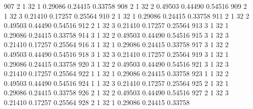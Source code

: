 \documentclass{article}
\begin{document}
\begin{Woutput}
 907      2       1      32       1       0.29086    0.24415    0.33758
 908      2       1      32       2       0.49503    0.44490    0.54516
 909      2       1      32       3       0.21410    0.17257    0.25564
 910      2       1      32       1       0.29086    0.24415    0.33758
 911      2       1      32       2       0.49503    0.44490    0.54516
 912      2       1      32       3       0.21410    0.17257    0.25564
 913      3       1      32       1       0.29086    0.24415    0.33758
 914      3       1      32       2       0.49503    0.44490    0.54516
 915      3       1      32       3       0.21410    0.17257    0.25564
 916      3       1      32       1       0.29086    0.24415    0.33758
 917      3       1      32       2       0.49503    0.44490    0.54516
 918      3       1      32       3       0.21410    0.17257    0.25564
 919      3       1      32       1       0.29086    0.24415    0.33758
 920      3       1      32       2       0.49503    0.44490    0.54516
 921      3       1      32       3       0.21410    0.17257    0.25564
 922      1       1      32       1       0.29086    0.24415    0.33758
 923      1       1      32       2       0.49503    0.44490    0.54516
 924      1       1      32       3       0.21410    0.17257    0.25564
 925      2       1      32       1       0.29086    0.24415    0.33758
 926      2       1      32       2       0.49503    0.44490    0.54516
 927      2       1      32       3       0.21410    0.17257    0.25564
 928      2       1      32       1       0.29086    0.24415    0.33758


\end{Woutput}
\end{document}
